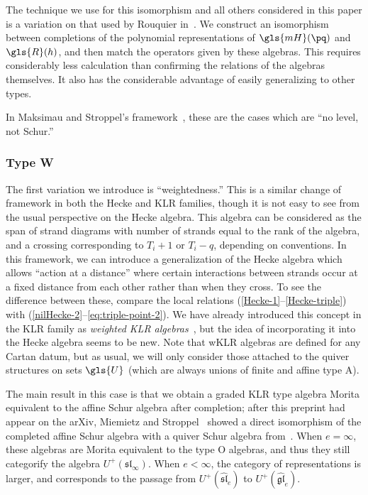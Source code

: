 The technique we use for this isomorphism and all others considered in
this paper is a variation on that
used by Rouquier in~\cite[\S~3.26]{Rou2KM}. We construct an isomorphism between
 completions of the polynomial representations of $\gls{mH}(\pq)$ and $\gls{R}(h)$,
 and then match the operators given by these algebras. This
 requires considerably less calculation than confirming the relations
 of the algebras themselves. It also has the considerable advantage of
 easily generalizing to other types.

 In Maksimau and Stroppel's framework~\cite{MS18}, these are the cases which are
 ``no level, not Schur.''

\subsubsection*{Type W} 
The first variation we introduce is ``weightedness.'' This is a
similar change of framework in both the Hecke and KLR families, though
it is not easy to see from the usual perspective on the Hecke algebra. This algebra
can be considered as the span of strand diagrams with number of strands equal to
the rank of the algebra, and a crossing corresponding to $T_i+1$ or
$T_i-q$, depending on conventions. In this framework, we can
introduce a generalization of the Hecke algebra which allows ``action
at a distance'' where certain interactions between strands occur at a
fixed distance from each other rather than when they cross. To see
the difference between these, compare the local relations
(\ref{Hecke-1}--\ref{Hecke-triple}) with
(\ref{nilHecke-2}--\ref{eq:triple-point-2}). We have already
introduced this concept in the KLR family as \emph{weighted KLR
 algebras}~\cite{WebwKLR}, but the idea of incorporating it into the
Hecke algebra seems to be new. Note that wKLR algebras are defined
for any Cartan datum, but as usual, we will only consider those
attached to the quiver structures on sets $\gls{U}$ (which are always unions
of finite and affine type A).

 The main result in this case is
that we obtain a graded KLR type algebra Morita equivalent to the
affine Schur algebra after completion; after this preprint had appear on the arXiv,
Miemietz and Stroppel~\cite{MiSt} showed a direct isomorphism of the \hbox{completed} affine Schur
algebra with a quiver Schur algebra from~\cite{SWschur}.
When $e=\infty$, these algebras are Morita equivalent to the type O
algebras, and thus they still categorify the algebra
$U^+(\mathfrak{sl}_\infty)$. When $e <\infty$, the category of
representations is larger, and corresponds to the passage from
$U^+(\mathfrak{\widehat{sl}}_e)$ to
$U^+(\mathfrak{\widehat{gl}}_e)$.

